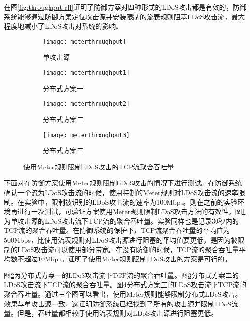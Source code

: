 在图\ref{fig:throughput-all}证明了防御方案对四种形式的LDoS攻击都是有效的，防御系统能够通过防御方案定位攻击源并安装限制的流表规则阻塞LDoS攻击流，最大程度地减小了LDoS攻击对系统的影响。


\begin{figure}
    \begin{subfigure}{.49\textwidth}
        \centering
        \texttt{[image: meterthroughput]}
        \caption{单攻击源}
        \label{fig:meter-throughput-single}
    \end{subfigure}
    \begin{subfigure}{.49\textwidth}
        \centering
        \texttt{[image: meterthroughput1]}
        \caption{分布式方案一}
        \label{fig:meter-throughput-2h-mod1}
    \end{subfigure}

    \begin{subfigure}{.49\textwidth}
        \centering
        \texttt{[image: meterthroughput2]}
        \caption{分布式方案二}
        \label{fig:meter-throughput-2h-mod2}
    \end{subfigure}
    \begin{subfigure}{.49\textwidth}
        \centering
        \texttt{[image: meterthroughput3]}
        \caption{分布式方案三}
        \label{fig:meter-throughput-2h-mod3}
    \end{subfigure}


    \caption{使用Meter规则限制LDoS攻击的TCP流聚合吞吐量}
    \label{fig:meter-throughput-all}
\end{figure}


下面对在防御方案使用Meter规则限制LDoS攻击的情况下进行测试。在防御系统确认一个流为LDoS攻击流的时候，使用特制的Meter规则对LDoS攻击流的速率限制。在实验中，限制被识别的LDoS攻击流的速率为100Mbps。则在之前的实验环境再进行一次测试，可验证方案使用Meter规则限制LDoS攻击方法的有效性。图\ref{fig:meter-throughput-single}为单攻击源的LDoS攻击流下TCP流的聚合吞吐量。实验同样也是记录30秒内的TCP流的聚合吞吐量。在防御系统的保护下，TCP流聚合吞吐量的平均值为500Mbps，比使用流表规则对LDoS攻击源进行阻塞的平均值要更低，是因为被限制的LDoS攻击流可以使用部分带宽。在没有防御的时候，TCP流的聚合吞吐量平均数不超过10Mbps。证明了使用Meter规则限制LDoS攻击的方案是可行的。

图\ref{fig:meter-throughput-2h-mod1}为分布式方案一的LDoS攻击流下TCP流的聚合吞吐量。图\ref{fig:meter-throughput-2h-mod2}分布式方案二的LDoS攻击流下TCP流的聚合吞吐量。图\ref{fig:meter-throughput-2h-mod3}分布式方案三的LDoS攻击流下TCP流的聚合吞吐量。通过三个图可以看出，使用Meter规则能够限制分布式LDoS攻击。效果与单攻击源一致，这证明防御系统已经找到了所有的攻击源并限制LDoS流量。但是，吞吐量都相较于使用流表规则对LDoS攻击源进行阻塞更低。

